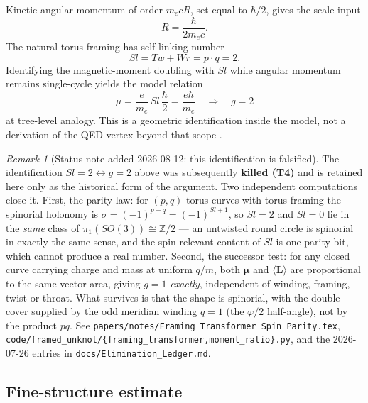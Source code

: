 \documentclass[11pt,a4paper]{article}
\theoremstyle{definition}
\theoremstyle{remark}
\newtheorem{remark}{Remark}[section]
\begin{document}
Kinetic angular momentum of order $m_e c R$, set equal to $\hbar/2$,
gives the scale input
\begin{equation}
R = \frac{\hbar}{2 m_e c}.
\end{equation}
The natural torus framing has self-linking number
\cite{Calugareanu,White,Fuller}
\begin{equation}
Sl = Tw + Wr = p\cdot q = 2.
\end{equation}
Identifying the magnetic-moment doubling with $Sl$ while angular momentum
remains single-cycle yields the model relation
\begin{equation}
\mu = \frac{e}{m_e}\, Sl\, \frac{\hbar}{2} = \frac{e\hbar}{m_e}
\quad\Rightarrow\quad g=2
\end{equation}
at tree-level analogy.  This is a geometric identification inside the
model, not a derivation of the QED vertex beyond that scope
\cite{Mobius2026}.

\begin{remark}[Status note added 2026-08-12: this identification is falsified]
The identification $Sl = 2 \leftrightarrow g = 2$ above was subsequently
\textbf{killed (T4)} and is retained here only as the historical form of the
argument.  Two independent computations close it.  First, the parity law: for
$(p,q)$ torus curves with torus framing the spinorial holonomy is
$\sigma = (-1)^{p+q} = (-1)^{Sl+1}$, so $Sl = 2$ and $Sl = 0$ lie in the
\emph{same} class of $\pi_1(SO(3)) \cong \mathbb{Z}/2$ --- an untwisted round
circle is spinorial in exactly the same sense, and the spin-relevant content of
$Sl$ is one parity bit, which cannot produce a real number.  Second, the
successor test: for any closed curve carrying charge and mass at uniform $q/m$,
both $\boldsymbol\mu$ and $\langle \mathbf{L}\rangle$ are proportional to the
same vector area, giving $g = 1$ \emph{exactly}, independent of winding,
framing, twist or throat.  What survives is that the shape is spinorial, with
the double cover supplied by the odd meridian winding $q = 1$ (the $\varphi/2$
half-angle), not by the product $pq$.  See
\texttt{papers/notes/Framing\_Transformer\_Spin\_Parity.tex},
\texttt{code/framed\_unknot/\{framing\_transformer,moment\_ratio\}.py}, and the
2026-07-26 entries in \texttt{docs/Elimination\_Ledger.md}.
\end{remark}

\subsection{Fine-structure estimate}
\end{document}
